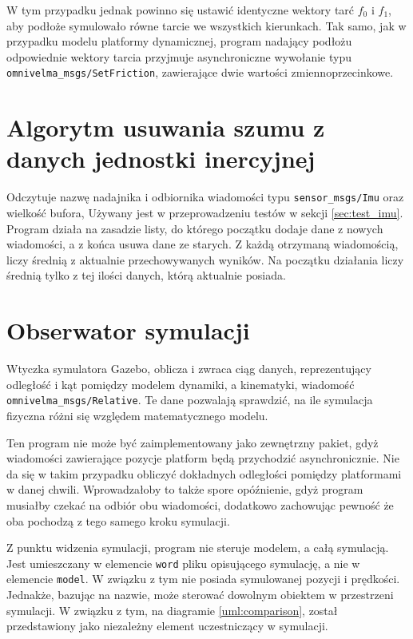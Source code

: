 	W tym przypadku jednak powinno się ustawić identyczne wektory tarć $f_0$ i $f_1$, aby podłoże symulowało równe tarcie we wszystkich kierunkach.
	Tak samo, jak w przypadku modelu platformy dynamicznej, program nadający podłożu odpowiednie wektory tarcia przyjmuje asynchroniczne wywołanie 
	typu \texttt{omnivelma\_msgs/SetFriction}, zawierające dwie wartości zmiennoprzecinkowe.
	
	
\section{Algorytm usuwania szumu z danych jednostki inercyjnej}
	Odczytuje nazwę nadajnika i odbiornika wiadomości typu \texttt{sensor\_msgs/Imu} oraz wielkość bufora,
	Używany jest w przeprowadzeniu testów w sekcji \ref{sec:test_imu}.
	Program działa na zasadzie listy, do którego początku dodaje dane z nowych wiadomości, a z końca usuwa dane ze starych.
	Z każdą otrzymaną wiadomością, liczy średnią z aktualnie przechowywanych wyników.
	Na początku działania liczy średnią tylko z tej ilości danych, którą aktualnie posiada.
	
\section{Obserwator symulacji}
	Wtyczka symulatora Gazebo, oblicza i zwraca ciąg danych, reprezentujący 
	odległość i kąt pomiędzy modelem dynamiki, a kinematyki, wiadomość \texttt{omnivelma\_msgs/Relative}.
	Te dane pozwalają sprawdzić, na ile symulacja fizyczna różni się względem matematycznego modelu.
	
	Ten program nie może być zaimplementowany jako zewnętrzny pakiet, gdyż wiadomości zawierające pozycje platform będą przychodzić asynchronicznie.
	Nie da się w takim przypadku obliczyć dokładnych odległości pomiędzy platformami w danej chwili. 
	Wprowadzałoby to także spore opóźnienie, gdyż program musiałby czekać na odbiór obu wiadomości, dodatkowo zachowując pewność że oba pochodzą z tego samego kroku symulacji.
	
	Z punktu widzenia symulacji, program nie steruje modelem, a całą symulacją. Jest umieszczany w elemencie \texttt{word} pliku opisującego symulację,
	a nie w elemencie \texttt{model}. W związku z tym nie posiada symulowanej pozycji i prędkości. 
	Jednakże, bazując na nazwie, może sterować dowolnym obiektem w przestrzeni symulacji.
	W związku z tym, na diagramie \ref{uml:comparison}, został przedstawiony jako niezależny element uczestniczący w symulacji.
	
